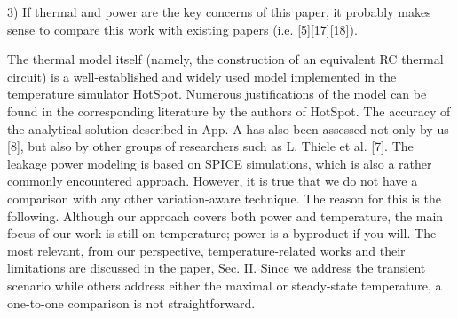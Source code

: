 \begin{reviewer}
3) If thermal and power are the key concerns of this paper, it probably makes sense to compare this work with existing papers (i.e. [5][17][18]).
\end{reviewer}
\begin{authors}
The thermal model itself (namely, the construction of an equivalent RC thermal circuit) is a well-established and widely used model implemented in the temperature simulator HotSpot.
Numerous justifications of the model can be found in the corresponding literature by the authors of HotSpot.
The accuracy of the analytical solution described in App. A has also been assessed not only by us [8], but also by other groups of researchers such as L. Thiele et al. [7].
The leakage power modeling is based on SPICE simulations, which is also a rather commonly encountered approach.
However, it is true that we do not have a comparison with any other variation-aware technique.
The reason for this is the following.
Although our approach covers both power and temperature, the main focus of our work is still on temperature; power is a byproduct if you will.
The most relevant, from our perspective, temperature-related works and their limitations are discussed in the paper, Sec. II.
Since we address the transient scenario while others address either the maximal or steady-state temperature, a one-to-one comparison is not straightforward.
\end{authors}
